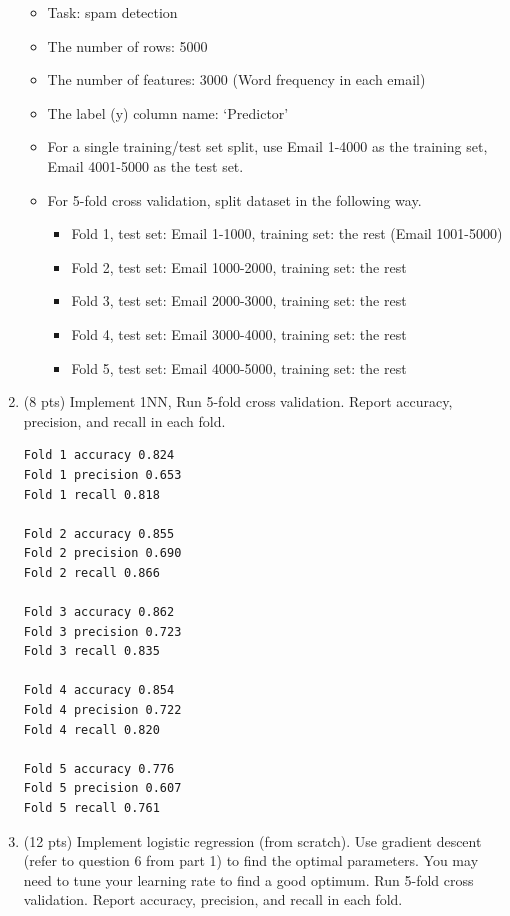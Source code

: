 \documentclass[a4paper]{article}
\theoremstyle{definition}
\newenvironment{soln}{
    \leavevmode\color{blue}\ignorespaces
}{}
\begin{document}
\begin{enumerate}
	\begin{itemize}
		\item Task: spam detection
		\item The number of rows: 5000
		\item The number of features: 3000 (Word frequency in each email)
		\item The label (y) column name: `Predictor'
		\item For a single training/test set split, use Email 1-4000 as the training set, Email 4001-5000 as the test set.
		\item For 5-fold cross validation, split dataset in the following way.
		\begin{itemize}
			\item Fold 1, test set: Email 1-1000, training set: the rest (Email 1001-5000)
			\item Fold 2, test set: Email 1000-2000, training set: the rest
			\item Fold 3, test set: Email 2000-3000, training set: the rest
			\item Fold 4, test set: Email 3000-4000, training set: the rest
			\item Fold 5, test set: Email 4000-5000, training set: the rest			
		\end{itemize}
	\end{itemize}
	
	\item (8 pts) Implement 1NN, Run 5-fold cross validation. Report accuracy, precision, and recall in each fold.
	
	\begin{soln} \begin{verbatim}
Fold 1 accuracy 0.824
Fold 1 precision 0.653
Fold 1 recall 0.818

Fold 2 accuracy 0.855
Fold 2 precision 0.690
Fold 2 recall 0.866

Fold 3 accuracy 0.862
Fold 3 precision 0.723
Fold 3 recall 0.835

Fold 4 accuracy 0.854
Fold 4 precision 0.722
Fold 4 recall 0.820

Fold 5 accuracy 0.776
Fold 5 precision 0.607
Fold 5 recall 0.761 
\end{verbatim}\end{soln}
	
	\item (12 pts) Implement logistic regression (from scratch). Use gradient descent (refer to question 6 from part 1) to find the optimal parameters. You may need to tune your learning rate to find a good optimum. Run 5-fold cross validation. Report accuracy, precision, and recall in each fold.
	

\end{enumerate}
\end{document}
